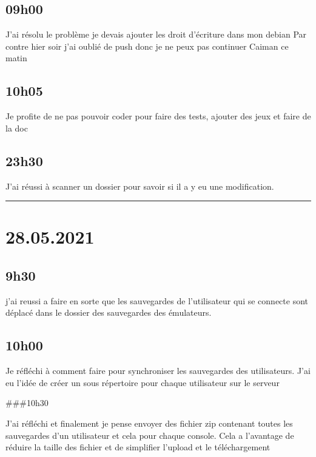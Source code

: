 \documentclass[a4paper,12pt,french]{sphinxmanual}
\begin{document}
\subsection{09h00}
\label{\detokenize{logbook:id165}}
\sphinxAtStartPar
J’ai résolu le problème je devais ajouter les droit d’écriture dans mon debian
Par contre hier soir j’ai oublié de push donc je ne peux pas continuer Caiman ce matin


\subsection{10h05}
\label{\detokenize{logbook:id166}}
\sphinxAtStartPar
Je profite de ne pas pouvoir coder pour faire des tests, ajouter des jeux et faire de la doc


\subsection{23h30}
\label{\detokenize{logbook:id167}}
\sphinxAtStartPar
J’ai réussi à scanner un dossier pour savoir si il a y eu une modification.


\bigskip\hrule\bigskip



\section{28.05.2021}
\label{\detokenize{logbook:id168}}

\subsection{9h30}
\label{\detokenize{logbook:id169}}
\sphinxAtStartPar
j’ai reussi a faire en sorte que les sauvegardes de l’utilisateur qui se connecte sont déplacé dans le dossier des sauvegardes des émulateurs.


\subsection{10h00}
\label{\detokenize{logbook:id170}}
\sphinxAtStartPar
Je réfléchi à comment faire pour synchroniser les sauvegardes des utilisateurs. J’ai eu l’idée de créer un sous répertoire pour chaque utilisateur sur le serveur

\sphinxAtStartPar
\#\#\#10h30

\sphinxAtStartPar
J’ai réfléchi et finalement je pense envoyer des fichier zip contenant toutes les sauvegardes d’un utilisateur et cela pour chaque console. Cela a l’avantage de réduire la taille des fichier et de simplifier l’upload et le téléchargement
\end{document}
